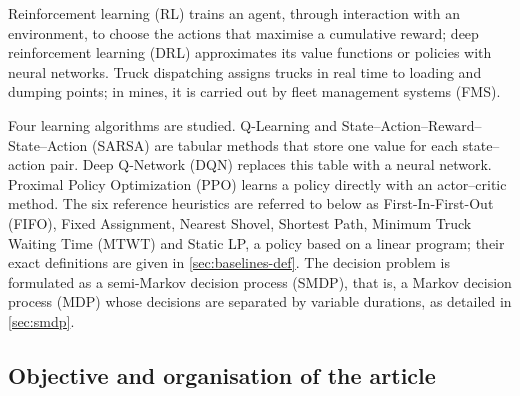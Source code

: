 \documentclass[11pt,a4paper]{article}
\newif\ifrevmarks
\newcommand{\revtag}[1]{\ifrevmarks\textsuperscript{\textcolor{red!70!black}{\scriptsize[#1]}}\fi}
\newcommand{\rev}[2]{\ifrevmarks{\color{revcolor}#2}\revtag{#1}\else#2\fi}
\newenvironment{revbloc}[1]{\par\ifrevmarks\color{revcolor}\noindent\revtag{#1}\ \fi}{\par}
\newif\ifcorrmarks
\newcommand{\corr}[1]{\ifcorrmarks\textcolor{corrcolor}{#1}\else#1\fi}
\begin{document}
\begin{revbloc}{m3, m4}
\corr{Reinforcement learning (RL) trains an agent, through interaction with an environment, to choose the actions that maximise a cumulative reward; deep reinforcement learning (DRL) approximates its value functions or policies with neural networks. Truck dispatching assigns trucks in real time to loading and dumping points; in mines, it is carried out by fleet management systems (FMS).}

Four learning algorithms are studied. Q-Learning and State--Action--Reward--State--Action (SARSA) are tabular methods that store one value for each state--action pair. Deep Q-Network (DQN) replaces this table with a neural network. Proximal Policy Optimization (PPO) learns a policy directly with an actor--critic method. \rev{T31}{The six reference heuristics are referred to below as First-In-First-Out (FIFO), Fixed Assignment, Nearest Shovel, Shortest Path, Minimum Truck Waiting Time (MTWT) and \corr{Static LP}, a policy based on a linear program;} their exact definitions are given in \cref{sec:baselines-def}. \corr{The decision problem is formulated as a semi-Markov decision process (SMDP), that is, a Markov decision process (MDP) whose decisions are separated by variable durations}, as detailed in \cref{sec:smdp}.
\end{revbloc}

\subsection{Objective and organisation of the article}
\end{document}
